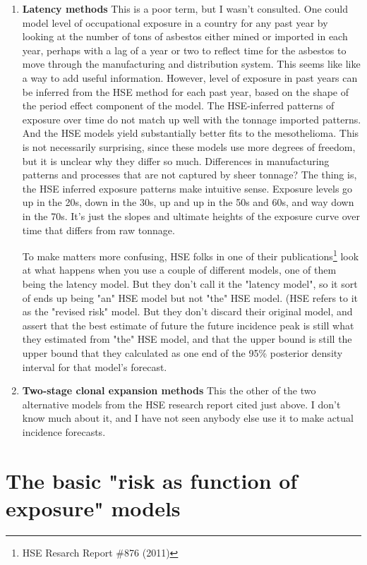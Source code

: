 \documentclass{article}\usepackage{graphicx, color}
\begin{document}
\begin{enumerate}
\item \textbf{Latency methods} This is a poor term, but I wasn't consulted.  One could model level of occupational exposure in a country for any past year by looking at the number of tons of asbestos either mined or imported in each year, perhaps with a lag of a year or two to reflect time for the asbestos to move through the manufacturing and distribution system.  This seems like like a way to add useful information.  However, level of exposure in past years can be inferred from the HSE method for each past year, based on the shape of the period effect component of the model.  The HSE-inferred patterns of exposure over time do not match up well with the tonnage imported patterns.  And the HSE models yield substantially better fits to the mesothelioma.  This is not necessarily surprising, since these models use more degrees of freedom, but it is unclear why they differ so much.  Differences in manufacturing patterns and processes that are not captured by sheer tonnage?  The thing is, the HSE inferred exposure patterns make intuitive sense.  Exposure levels go up in the 20s, down in the 30s, up and up in the 50s and 60s, and way down in the 70s.  It's just the slopes and ultimate heights of the exposure curve over time that differs from raw tonnage.

To make matters more confusing, HSE folks in one of their publications\footnote{HSE Resarch Report \#876 (2011)} look at what happens when you use a couple of different models, one of them being the latency model.  But they don't call it the "latency model", so it sort of ends up being "an" HSE model but not "the" HSE model.  (HSE refers to it as the "revised risk" model.  But they don't discard their original model, and assert that the best estimate of future the future incidence peak is still what they estimated from "the" HSE model, and that the upper bound is still the upper bound that they calculated as one end of the 95\% posterior density interval for that model's forecast. 

\item \textbf{Two-stage clonal expansion methods} This the other of the two alternative models from the HSE research report cited just above.  I don't know much about it, and I have not seen anybody else use it to make actual incidence forecasts. 

\end{enumerate}


\section{The basic "risk as function of exposure" models}
\end{document}
